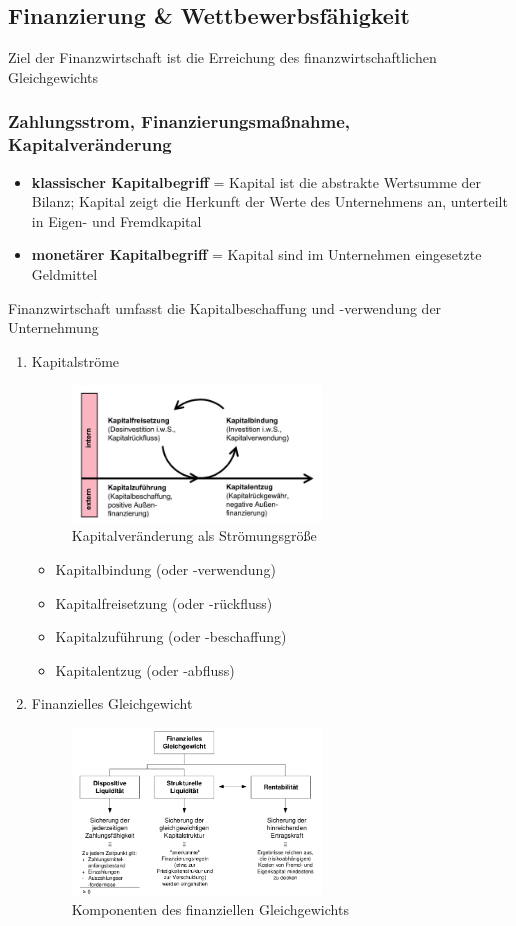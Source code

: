 \documentclass[11pt]{article}
\begin{document}
\subsection{Finanzierung \& Wettbewerbsfähigkeit}
\label{sec:org24c92f4}
Ziel der Finanzwirtschaft ist die Erreichung des finanzwirtschaftlichen Gleichgewichts
\subsubsection{Zahlungsstrom, Finanzierungsmaßnahme, Kapitalveränderung}
\label{sec:orgb598bf8}
\begin{itemize}
\item \textbf{klassischer Kapitalbegriff} = Kapital ist die abstrakte Wertsumme der Bilanz; Kapital zeigt die Herkunft der Werte des Unternehmens an, unterteilt in Eigen- und Fremdkapital
\item \textbf{monetärer Kapitalbegriff} = Kapital sind im Unternehmen eingesetzte Geldmittel
\end{itemize}

Finanzwirtschaft umfasst die Kapitalbeschaffung und -verwendung der Unternehmung

\begin{enumerate}
\item Kapitalströme
\label{sec:orga499bb9}
\begin{figure}[htbp]
\centering
\includegraphics[width=250px]{./pictures/kapitalstroeme.png}
\caption{Kapitalveränderung als Strömungsgröße}
\end{figure} 
\begin{itemize}
\item Kapitalbindung (oder -verwendung)
\item Kapitalfreisetzung (oder -rückfluss)
\item Kapitalzuführung (oder -beschaffung)
\item Kapitalentzug (oder -abfluss)
\end{itemize}

\item Finanzielles Gleichgewicht
\label{sec:org75e022d}
\begin{figure}[htbp]
\centering
\includegraphics[width=250px]{./pictures/finanzgg.png}
\caption{Komponenten des finanziellen Gleichgewichts}
\end{figure}
\end{enumerate}
\end{document}
